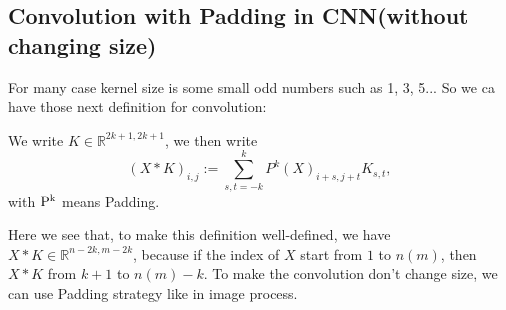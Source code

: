 \subsection{Convolution with Padding in CNN(without changing size)}
For many case kernel size is some small odd numbers such as 1, 3, 5... So we ca have those next definition for convolution:
\begin{definition}

We write $K\in \mathbb R^{2k+1, 2k+1}$, we then write
\begin{equation}\label{ConvPadding}
(X \ast K)_{i,j} :=\sum_{s, t = -k}^k P^k(X)_{i + s, j + t} K_{s,t},
\end{equation}
with $\rm{P}^k$ means Padding. 
\end{definition}
Here we see that, to make this definition well-defined, we have $X\ast K \in \mathbb{R}^{n-2k, m-2k}$, because if the index of $X$ start from $1$ to $n(m)$, then $X \ast K$ from $k+1$ to $n(m) - k$. To make the convolution don't change size, we can use Padding strategy like in image process. 
